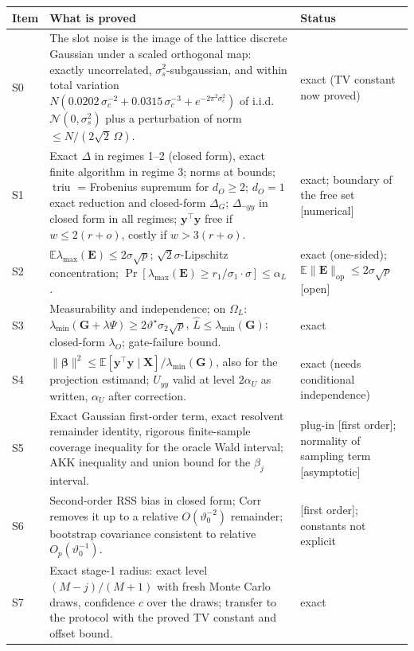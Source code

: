 \documentclass[11pt]{article}
\theoremstyle{definition}
\theoremstyle{plain}
\newcommand{\bX}{\mathbf{X}}
\newcommand{\bG}{\mathbf{G}}
\newcommand{\by}{\mathbf{y}}
\newcommand{\bbeta}{\boldsymbol{\beta}}
\DeclareMathOperator{\triu}{triu}
\newcommand{\Ex}{\mathbb{E}}
\newcommand{\bE}{\mathbf{E}}
\newcommand{\lmin}{\lambda_{\min}}
\newcommand{\lmax}{\lambda_{\max}}
\newcommand{\op}{\mathrm{op}}
\newcommand{\Corr}{\mathrm{Corr}}
\newcommand{\status}[1]{\textsf{\small[#1]}}
\begin{document}
\begin{table}[h]
\centering\small
\begin{tabularx}{\textwidth}{@{}l>{\raggedright\arraybackslash}X>{\raggedright\arraybackslash}p{3.6cm}@{}}
\toprule
Item & What is proved & Status \\
\midrule
S0 & The slot noise is the image of the lattice discrete Gaussian under a scaled orthogonal map: exactly uncorrelated, $\sigma_s^2$-subgaussian, and within total variation $N(0.0202\,\sigma_c^{-2}+0.0315\,\sigma_c^{-3}+e^{-2\pi^2\sigma_c^2})$ of i.i.d.\ $\mathcal N(0,\sigma_s^2)$ plus a perturbation of norm $\le N/(2\sqrt2\,\Omega)$. & exact (TV constant now proved) \\
S1 & Exact $\Delta$ in regimes 1--2 (closed form), exact finite algorithm in regime 3; norms at bounds; $\triu$ = Frobenius supremum for $d_O\ge2$; $d_O=1$ exact reduction and closed-form $\Delta_G$; $\Delta_{\neg yy}$ in closed form in all regimes; $\by^\top\by$ free if $w\le2(r+o)$, costly if $w>3(r+o)$. & exact; boundary of the free set \status{numerical} \\
S2 & $\Ex\lmax(\bE)\le2\sigma\sqrt p$; $\sqrt2\sigma$-Lipschitz concentration; $\Pr[\lmax(\bE)\ge r_1/\sigma_1\cdot\sigma]\le\alpha_L$. & exact (one-sided); $\Ex\|\bE\|_\op\le2\sigma\sqrt p$ \status{open} \\
S3 & Measurability and independence; on $\Omega_L$: $\lmin(\bG+\lambda\Psi)\ge2\vartheta^\star\sigma_2\sqrt p$, $\hat L\le\lmin(\bG)$; closed-form $\lambda_O$; gate-failure bound. & exact \\
S4 & $\|\bbeta\|^2\le\Ex[\by^\top\by\mid\bX]/\lmin(\bG)$, also for the projection estimand; $U_{yy}$ valid at level $2\alpha_U$ as written, $\alpha_U$ after correction. & exact (needs conditional independence) \\
S5 & Exact Gaussian first-order term, exact resolvent remainder identity, rigorous finite-sample coverage inequality for the oracle Wald interval; AKK inequality and union bound for the $\beta_j$ interval. & plug-in \status{first order}; normality of sampling term \status{asymptotic} \\
S6 & Second-order RSS bias in closed form; $\Corr$ removes it up to a relative $O(\vartheta_0^{-2})$ remainder; bootstrap covariance consistent to relative $O_p(\vartheta_0^{-1})$. & \status{first order}; constants not explicit \\
S7 & Exact stage-1 radius: exact level $(M-j)/(M+1)$ with fresh Monte Carlo draws, confidence $c$ over the draws; transfer to the protocol with the proved TV constant and offset bound. & exact \\

\end{tabularx}
\end{table}
\end{document}
